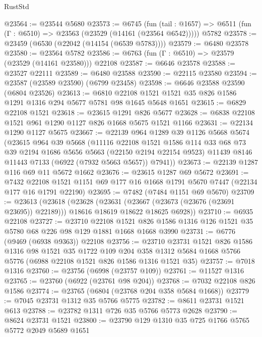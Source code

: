 \begin{lexlean}{RustStd}
\begin{coremodule}
@23564 := @23544 @5680
@23573 := @6745
    (fun (tail : @1657) => @6511 (fun (Γ : @6510) => @23563 (@23529 (@14161 (@23564 @6542)))))
    @5782
@23578 := @23459 (@6530 (@22042 (@14154 (@6539 @5783))))
@23579 := @6480 @23578
@23580 := @23564 @5782
@23586 := @6763 (fun (Γ : @6510) => @23579 (@23529 (@14161 @23580))) @22108
@23587 := @6646 @23578
@23588 := @23527 @22111
@23589 := @6480 @23588
@23590 := @22115 @23580
@23594 := @23587 (@23589 @23590) (@6799 @23458)
@23598 := @6646 @23588 @23590 (@6804 @23526)
@23613 := @6810 @22108 @1521 @1521 @35 @826 @1586 @1291 @1316 @294 @5677 @5781 @98 @1645 @5648 @1651
@23615 := @6829 @22108 @1521
@23618 := @23615 @1291 @826 @5677
@23628 := @6838 @22108 @1521 @961 @1290 @1127 @826 @1668 @5675 @1521 @1166
@23631 := @22134 @1290 @1127 @5675
@23667 := @22139
    @964
    @1289
    @39
    @1126
    @5668
    @5674
    (@23615
      @964
      @39
      @5668
      (@11116
        @22108
        @1521
        @1586
        @114
        @33
        @68
        @73
        @39
        @2194
        @1686
        @5656
        @5663
        (@22150 @2194 @22154 @9523)
        @11439
        @8146
        @11443
        @7133
        (@6922 (@7932 @5663 @5657))
        @7941))
@23673 := @22139 @1287 @116 @69 @11 @5672 @1662
@23676 := @23615 @1287 @69 @5672
@23691 := @7432
    @22108
    @1521
    @1151
    @69
    @177
    @16
    @1668
    @1791
    @5670
    @7447
    (@22134 @177 @16 @1791 @22190)
@23695 := @7482 (@7484 @1151 @69 @5670)
@23709 := @23613
    (@23618
      (@23628
        (@23631 (@23667 (@23673 (@23676 (@23691 @23695)) @22189)))
        @18616
        @18619
        @18622
        @18625
        @6928))
@23710 := @6935 @22108
@23727 := @23710
    @22108
    @1521
    @826
    @1586
    @1316
    @126
    @1521
    @35
    @5780
    @68
    @226
    @98
    @129
    @1881
    @1668
    @1668
    @3990
@23731 := @6776 (@9469 (@6938 @9363)) @22108
@23756 := @23710
    @23731
    @1521
    @826
    @1586
    @1316
    @98
    @1521
    @35
    @1722
    @109
    @204
    @358
    @1312
    @5684
    @1668
    @5766
    @5776
    (@6988 @22108 @1521 @826 @1586 @1316 @1521 @35)
@23757 := @7018 @1316
@23760 := @23756 (@6998 (@23757 @109))
@23761 := @11527 @1316
@23765 := @23760 (@6922 (@23761 @98 @204))
@23768 := @7032 @22108 @826 @1586
@23774 := @23765 (@6804 (@23768 @204 @358 @5684 @1668))
@23779 := @7045 @23731 @1312 @35 @5766 @5775
@23782 := @8611 @23731 @1521 @613
@23788 := @23782 @1311 @726 @35 @5766 @5773 @2628
@23790 := @8624 @23731 @1521
@23800 := @23790 @129 @1310 @35 @725 @1766 @5765 @5772 @2049 @5689 @1651

\end{coremodule}
\end{lexlean}
